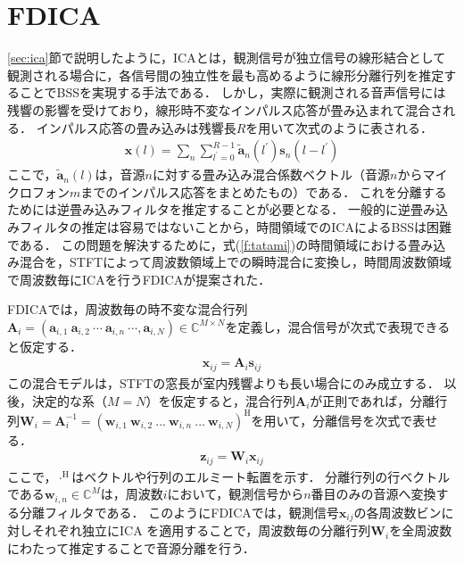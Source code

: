 \section{FDICA}
\label{sec:fdica}
\ref{sec:ica}節で説明したように，ICAとは，観測信号が独立信号の線形結合として観測される場合に，各信号間の独立性を最も高めるように線形分離行列を推定することでBSSを実現する手法である．
しかし，実際に観測される音声信号には残響の影響を受けており，線形時不変なインパルス応答が畳み込まれて混合される．
インパルス応答の畳み込みは残響長$R$を用いて次式のように表される．
\begin{align}
  \bm{x}(l) = \sum_n \sum_{l^{'}=0}^{R-1} \tilde{\bm{a}}_n(l^{'}) \bm{s}_n(l-l^{'})
  \label{f:tatami}
\end{align}
ここで，$\tilde{\bm{a}}_n(l)$は，音源$n$に対する畳み込み混合係数ベクトル（音源$n$からマイクロフォン$m$までのインパルス応答をまとめたもの）である．
これを分離するためには逆畳み込みフィルタを推定することが必要となる．
一般的に逆畳み込みフィルタの推定は容易ではないことから，時間領域でのICAによるBSSは困難である．
この問題を解決するために，式(\ref{f:tatami})の時間領域における畳み込み混合を，STFTによって周波数領域上での瞬時混合に変換し，時間周波数領域で周波数毎にICAを行うFDICAが提案された．

FDICAでは，周波数毎の時不変な混合行列 $\bm{A}_{i} = (\bm{a}_{i, 1} ~\bm{a}_{i, 2} ~\cdots ~\bm{a}_{i, n}~\cdots,\bm{a}_{i, N} )\in \mathbb{C}^{M\times N}$を定義し，混合信号が次式で表現できると仮定する．
\begin{align}
 \bm{x}_{ij} = \bm{A}_i\bm{s}_{ij}
\end{align}
この混合モデルは，STFTの窓長が室内残響よりも長い場合にのみ成立する．
以後，決定的な系（$M=N$）を仮定すると，混合行列$\bm{A}_{i}$が正則であれば，分離行列$\bm{W}_i=\bm{A}_i^{-1}=(\bm{w}_{i,1}~\bm{w}_{i,2}~ ...~ \bm{w}_{i, n}~ ... ~\bm{w}_{i, N})^{\mathrm{H}}$を用いて，分離信号を次式で表せる．
\begin{align}
 \bm{z}_{ij} = \bm{W}_{i}\bm{x}_{ij} \label{eq:sep}
\end{align}
ここで，$\cdot^\mathrm{H}$はベクトルや行列のエルミート転置を示す．
分離行列の行ベクトルである$\bm{w}_{i,n}\in\mathbb{C}^M$は，周波数$i$において，観測信号から$n$番目のみの音源へ変換する分離フィルタである．
このようにFDICAでは，観測信号$\bm{x}_{ij}$の各周波数ビンに対しそれぞれ独立にICA を適用することで，周波数毎の分離行列$\bm{W}_{i}$を全周波数にわたって推定することで音源分離を行う．

